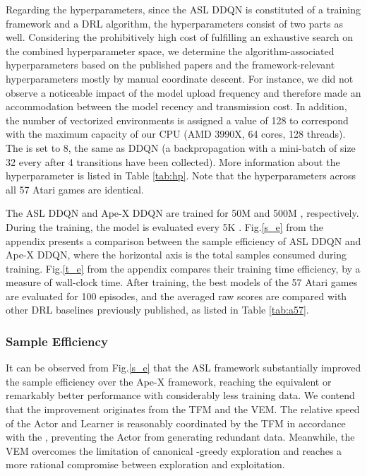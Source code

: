 \documentclass[journal]{IEEEtran}
\begin{document}
Regarding the hyperparameters, since the ASL DDQN is constituted of a training framework and a DRL algorithm, the hyperparameters consist of two parts as well. Considering the prohibitively high cost of fulfilling an exhaustive search on the combined hyperparameter space, we determine the algorithm-associated hyperparameters based on the published papers and the framework-relevant hyperparameters mostly by manual coordinate descent. For instance, we did not observe a noticeable impact of the model upload frequency  and therefore made an accommodation between the model recency and transmission cost. In addition, the number of vectorized environments  is assigned a value of 128 to correspond with the maximum capacity of our CPU (AMD 3990X, 64 cores, 128 threads). The  is set to 8, the same as DDQN (a backpropagation with a mini-batch of size 32 every after 4 transitions have been collected). More information about the hyperparameter is listed in Table \ref{tab:hp}. Note that the hyperparameters across all 57 Atari games are identical.

The ASL DDQN and Ape-X DDQN are trained for 50M and 500M , respectively. During the training, the model is evaluated every 5K . Fig.\ref{s_e} from the appendix presents a comparison between the sample efficiency of ASL DDQN and Ape-X DDQN, where the horizontal axis is the total samples consumed during training. Fig.\ref{t_e} from the appendix compares their training time efficiency, by a measure of wall-clock time. After training, the best models of the 57 Atari games are evaluated for 100 episodes, and the averaged raw scores are compared with other DRL baselines previously published, as listed in Table \ref{tab:a57}. 

\subsubsection{Sample Efficiency}
It can be observed from Fig.\ref{s_e} that the ASL framework substantially improved the sample efficiency over the Ape-X framework, reaching the equivalent or remarkably better performance with considerably less training data. We contend that the improvement originates from the TFM and the VEM. The relative speed of the Actor and Learner is reasonably coordinated by the TFM in accordance with the , preventing the Actor from generating redundant data. Meanwhile, the VEM overcomes the limitation of canonical -greedy exploration and reaches a more rational compromise between exploration and exploitation.
\end{document}
